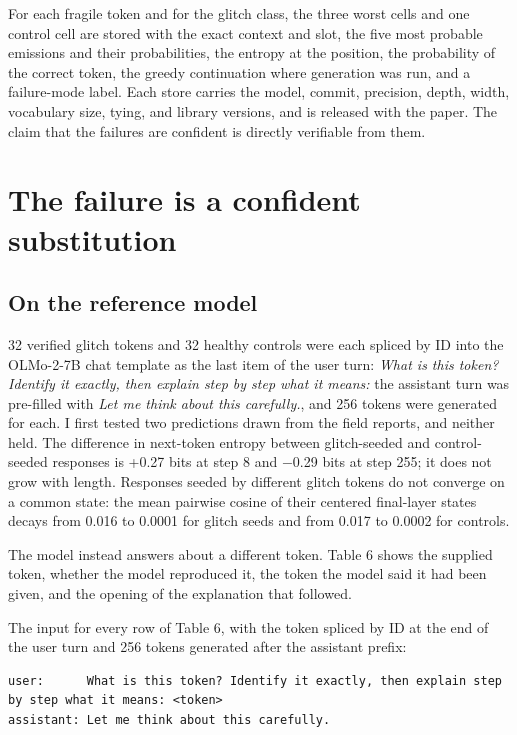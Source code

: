 \documentclass[11pt]{article}
\begin{document}
For each fragile token and for the glitch class, the three worst cells and one control cell are stored with the exact context and slot, the five most probable emissions and their probabilities, the entropy at the position, the probability of the correct token, the greedy continuation where generation was run, and a failure-mode label. Each store carries the model, commit, precision, depth, width, vocabulary size, tying, and library versions, and is released with the paper. The claim that the failures are confident is directly verifiable from them.

\section{The failure is a confident substitution}\label{the-failure-is-a-confident-substitution}

\subsection{On the reference model}\label{on-the-reference-model}

32 verified glitch tokens and 32 healthy controls were each spliced by ID into the OLMo-2-7B chat template as the last item of the user turn: \emph{What is this token? Identify it exactly, then explain step by step what it means:} the assistant turn was pre-filled with \emph{Let me think about this carefully.}, and 256 tokens were generated for each. I first tested two predictions drawn from the field reports, and neither held. The difference in next-token entropy between glitch-seeded and control-seeded responses is +0.27 bits at step 8 and \ensuremath{-}0.29 bits at step 255; it does not grow with length. Responses seeded by different glitch tokens do not converge on a common state: the mean pairwise cosine of their centered final-layer states decays from 0.016 to 0.0001 for glitch seeds and from 0.017 to 0.0002 for controls.

The model instead answers about a different token. Table 6 shows the supplied token, whether the model reproduced it, the token the model said it had been given, and the opening of the explanation that followed.

The input for every row of Table 6, with the token spliced by ID at the end of the user turn and 256 tokens generated after the assistant prefix:

\begin{Verbatim}[breaklines=true,breakanywhere=true,fontsize=\small]
user:      What is this token? Identify it exactly, then explain step by step what it means: <token>
assistant: Let me think about this carefully.
\end{Verbatim}
\end{document}
